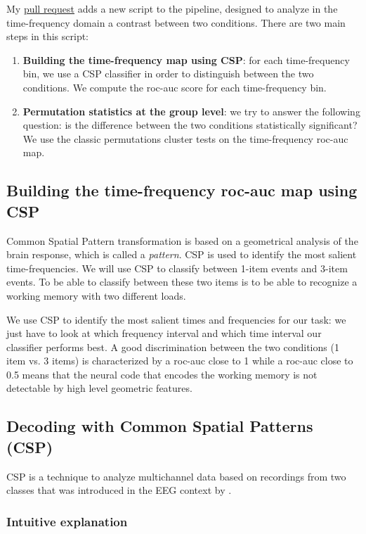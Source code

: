 My \href{https://github.com/mne-tools/mne-bids-pipeline/pull/414}{pull request} adds a new script to the pipeline, designed to analyze in the time-frequency domain a contrast between two conditions. There are two main steps in this script:
\begin{enumerate}
    \item \textbf{Building the time-frequency map using CSP}: for each time-frequency bin, we use a CSP classifier in order to distinguish between the two conditions. We compute the roc-auc score for each time-frequency bin.
    \item \textbf{Permutation statistics at the group level}: we try to answer the following question: is the difference between the two conditions statistically significant? We use the classic permutations cluster tests on the time-frequency roc-auc map.
\end{enumerate}

\subsection{Building the time-frequency roc-auc map using CSP}

Common Spatial Pattern transformation is based on a geometrical analysis of the brain response, which is called a \textit{pattern}. CSP is used to identify the most salient time-frequencies. We will use CSP to classify between 1-item events and 3-item events. To be able to classify between these two items is to be able to recognize a working memory with two different loads.

We use CSP to identify the most salient times and frequencies for our task: we just have to look at which frequency interval and which time interval our classifier performs best. A good discrimination between the two conditions (1 item vs. 3 items) is characterized by a roc-auc close to 1 while a roc-auc close to 0.5 means that the neural code that encodes the working memory is not detectable by high level geometric features.

\subsection{Decoding with Common Spatial Patterns (CSP)}

CSP is a technique to analyze multichannel data based on recordings from two classes that was introduced in the EEG context by \cite{koles1990spatial}.

\subsubsection{Intuitive explanation}

